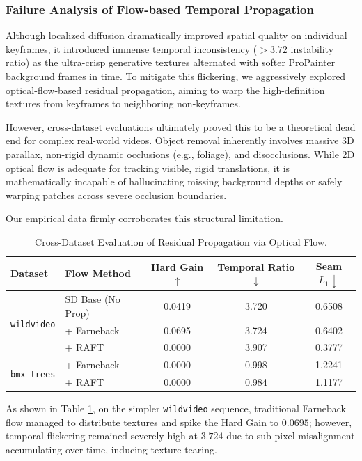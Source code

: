 \subsubsection{Failure Analysis of Flow-based Temporal Propagation}

Although localized diffusion dramatically improved spatial quality on individual keyframes, it introduced immense temporal inconsistency ($>3.72$ instability ratio) as the ultra-crisp generative textures alternated with softer ProPainter background frames in time. To mitigate this flickering, we aggressively explored optical-flow-based residual propagation, aiming to warp the high-definition textures from keyframes to neighboring non-keyframes.

However, cross-dataset evaluations ultimately proved this to be a theoretical dead end for complex real-world videos. Object removal inherently involves massive 3D parallax, non-rigid dynamic occlusions (e.g., foliage), and disocclusions. While 2D optical flow is adequate for tracking visible, rigid translations, it is mathematically incapable of hallucinating missing background depths or safely warping patches across severe occlusion boundaries. 

Our empirical data firmly corroborates this structural limitation.

\begin{table}[t]
\centering
\small
\setlength{\tabcolsep}{4pt}
\caption{Cross-Dataset Evaluation of Residual Propagation via Optical Flow.}
\label{tab:flow_failure}
\begin{tabular}{llccc}
\toprule
Dataset & Flow Method & Hard Gain $\uparrow$ & Temporal Ratio $\downarrow$ & Seam $L_1 \downarrow$ \\
\midrule
\multirow{3}{*}{\texttt{wildvideo}} 
 & SD Base (No Prop) & 0.0419 & 3.720 & 0.6508 \\
 & + Farneback & 0.0695 & 3.724 & 0.6402 \\
 & + RAFT & 0.0000 & 3.907 & 0.3777 \\
\midrule
\multirow{2}{*}{\texttt{bmx-trees}} 
 & + Farneback & 0.0000 & 0.998 & 1.2241 \\
 & + RAFT & 0.0000 & 0.984 & 1.1177 \\
\bottomrule
\end{tabular}
\end{table}

As shown in Table \ref{tab:flow_failure}, on the simpler \texttt{wildvideo} sequence, traditional Farneback flow managed to distribute textures and spike the Hard Gain to $0.0695$; however, temporal flickering remained severely high at $3.724$ due to sub-pixel misalignment accumulating over time, inducing texture tearing.


